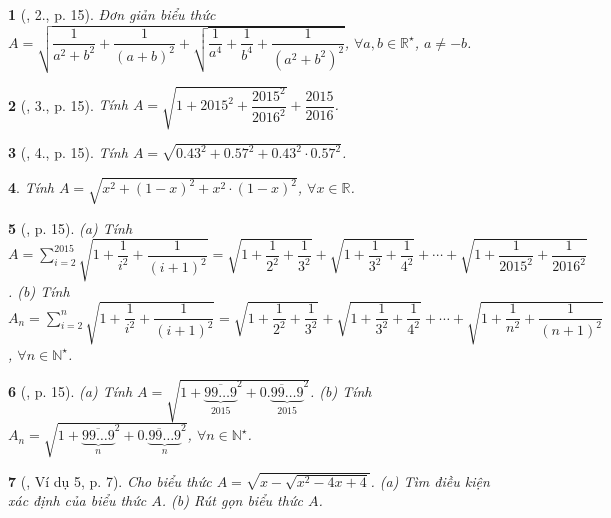 \documentclass{article}
\newtheorem{baitoan}{}
\begin{document}
\begin{baitoan}[\cite{Binh_boi_duong_Toan_9_tap_1}, 2., p. 15]
	Đơn giản biểu thức $A = \sqrt{\dfrac{1}{a^2 + b^2} + \dfrac{1}{(a + b)^2} + \sqrt{\dfrac{1}{a^4} + \dfrac{1}{b^4} + \dfrac{1}{(a^2 + b^2)^2}}}$, $\forall a,b\in\mathbb{R}^\star$, $a\ne-b$.
\end{baitoan}

\begin{baitoan}[\cite{Binh_boi_duong_Toan_9_tap_1}, 3., p. 15]
	Tính $A = \sqrt{1 + 2015^2 + \dfrac{2015^2}{2016^2}} + \dfrac{2015}{2016}$.
\end{baitoan}

\begin{baitoan}[\cite{Binh_boi_duong_Toan_9_tap_1}, 4., p. 15]
	Tính $A = \sqrt{0.43^2 + 0.57^2 + 0.43^2\cdot0.57^2}$.
\end{baitoan}

\begin{baitoan}
	Tính $A = \sqrt{x^2 + (1 - x)^2 + x^2\cdot(1 - x)^2}$, $\forall x\in\mathbb{R}$.
\end{baitoan}

\begin{baitoan}[\cite{Binh_boi_duong_Toan_9_tap_1}, p. 15]
	(a) Tính $A = \sum_{i=2}^{2015} \sqrt{1 + \dfrac{1}{i^2} + \dfrac{1}{(i + 1)^2}} = \sqrt{1 + \dfrac{1}{2^2} + \dfrac{1}{3^2}} + \sqrt{1 + \dfrac{1}{3^2} + \dfrac{1}{4^2}} + \cdots + \sqrt{1 + \dfrac{1}{2015^2} + \dfrac{1}{2016^2}}$. (b) Tính $A_n = \sum_{i=2}^n \sqrt{1 + \dfrac{1}{i^2} + \dfrac{1}{(i + 1)^2}} = \sqrt{1 + \dfrac{1}{2^2} + \dfrac{1}{3^2}} + \sqrt{1 + \dfrac{1}{3^2} + \dfrac{1}{4^2}} + \cdots + \sqrt{1 + \dfrac{1}{n^2} + \dfrac{1}{(n + 1)^2}}$, $\forall n\in\mathbb{N}^\star$.
\end{baitoan}

\begin{baitoan}[\cite{Binh_boi_duong_Toan_9_tap_1}, p. 15]
	(a) Tính $A = \sqrt{1 + \overline{\underbrace{99\ldots9}_{2015}}^2 + \overline{0.\underbrace{99\ldots9}_{2015}}^2}$. (b) Tính $A_n = \sqrt{1 + \overline{\underbrace{99\ldots9}_n}^2 + \overline{0.\underbrace{99\ldots9}_n}^2}$, $\forall n\in\mathbb{N}^\star$.
\end{baitoan}


\begin{baitoan}[\cite{Binh_Toan_9_tap_1}, Ví dụ 5, p. 7]
	Cho biểu thức $A = \sqrt{x - \sqrt{x^2 - 4x + 4}}$. (a) Tìm điều kiện xác định của biểu thức $A$. (b) Rút gọn biểu thức $A$.
\end{baitoan}
\end{document}
